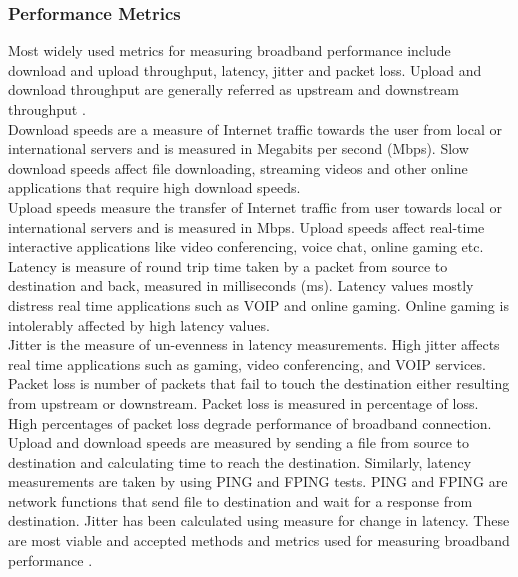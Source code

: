 \documentclass{sig-alternate-10pt}
\begin{document}
\subsubsection {Performance Metrics}
Most widely used metrics for measuring broadband performance include download and upload throughput, latency, jitter and packet loss. Upload and download throughput are generally referred as upstream and downstream throughput \cite{08,12,16}.\\
\indent Download speeds are a measure of Internet traffic towards the user from local or international servers and is measured in Megabits per second (Mbps). Slow download speeds affect file downloading, streaming videos and other online applications that require high download speeds.\\
\indent Upload speeds measure the transfer of Internet traffic from user towards local or international servers and is measured in Mbps. Upload speeds affect real-time interactive applications like video conferencing, voice chat, online gaming etc.\\
\indent Latency is measure of round trip time taken by a packet from source to destination and back, measured in milliseconds (ms). Latency values mostly distress real time applications such as VOIP and online gaming. Online gaming is intolerably affected by high latency values.\\
\indent Jitter is the measure of un-evenness in latency measurements. High jitter affects real time applications such as gaming, video conferencing, and VOIP services.\\
\indent Packet loss is number of packets that fail to touch the destination either resulting from upstream or downstream. Packet loss is measured in percentage of loss. High percentages of packet loss degrade performance of broadband connection.\\
\indent Upload and download speeds are measured by sending a file from source to destination and calculating time to reach the destination. Similarly, latency measurements are taken by using PING and FPING tests. PING and FPING are network functions that send file to destination and wait for a response from destination. Jitter has been calculated using measure for change in latency. These are most viable and accepted methods and metrics used for measuring broadband performance \cite{23}.
\end{document}
